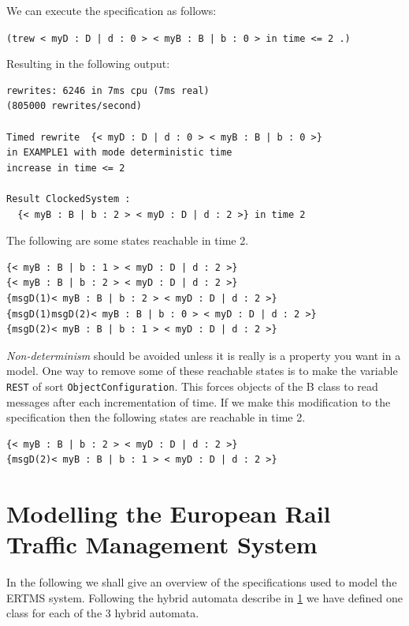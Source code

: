 We can execute the specification as follows:
\begin{center}
\texttt{(trew {< myD : D | d : 0 > < myB : B | b : 0 >} in time <= 2 .)}
\end{center}

Resulting in the following output:
\begin{verbatim}
rewrites: 6246 in 7ms cpu (7ms real) 
(805000 rewrites/second)

Timed rewrite  {< myD : D | d : 0 > < myB : B | b : 0 >} 
in EXAMPLE1 with mode deterministic time 
increase in time <= 2

Result ClockedSystem :
  {< myB : B | b : 2 > < myD : D | d : 2 >} in time 2
\end{verbatim}

The following are some states reachable in time 2.

\begin{verbatim}
{< myB : B | b : 1 > < myD : D | d : 2 >}
{< myB : B | b : 2 > < myD : D | d : 2 >}
{msgD(1)< myB : B | b : 2 > < myD : D | d : 2 >}
{msgD(1)msgD(2)< myB : B | b : 0 > < myD : D | d : 2 >}
{msgD(2)< myB : B | b : 1 > < myD : D | d : 2 >}
\end{verbatim}

\emph{Non-determinism} should be avoided unless it is really is a property you want in a model. One way to remove some of these reachable states is to make the variable \texttt{REST} of sort \texttt{ObjectConfiguration}. This forces objects of the B class to read messages after each incrementation of time. If we make this modification to the specification then the following states are reachable in time 2.
\begin{verbatim}
{< myB : B | b : 2 > < myD : D | d : 2 >}
{msgD(2)< myB : B | b : 1 > < myD : D | d : 2 >}
\end{verbatim}


\section{Modelling the European Rail Traffic Management System}
In the following we shall give an overview of the specifications used to model the ERTMS system. Following the hybrid automata describe in \ref{} we have defined one class for each of the 3 hybrid automata.
